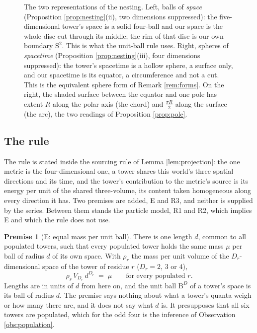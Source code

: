 \documentclass[11pt]{article}
\theoremstyle{definition}
\newtheorem{premise}[theorem]{Premise}
\newcommand{\B}{\mathrm{B}}
\newcommand{\Sph}{\mathrm{S}}
\begin{document}
\begin{figure}[htbp]
\caption{The two representations of the nesting. Left, balls of \emph{space} (Proposition \ref{prop:nesting}(ii), two dimensions suppressed): the five-dimensional tower's space is a solid four-ball and our space is the whole disc cut through its middle; the rim of that disc is our own boundary $\Sph^{2}$. This is what the unit-ball rule uses. Right, spheres of \emph{spacetime} (Proposition \ref{prop:nesting}(iii), four dimensions suppressed): the tower's spacetime is a hollow sphere, a surface only, and our spacetime is its equator, a circumference and not a cut. This is the equivalent sphere form of Remark \ref{rem:forms}. On the right, the shaded surface between the equator and one pole has extent $R$ along the polar axis (the chord) and $\tfrac{\pi R}{2}$ along the surface (the arc), the two readings of Proposition \ref{prop:pole}.}
\label{fig:ballsphere}
\end{figure}

\subsection{The rule}\label{subsec:rule}

The rule is stated inside the sourcing rule of Lemma \ref{lem:projection}: the one metric is the four-dimensional one, a tower shares this world's three spatial directions and its time, and the tower's contribution to the metric's source is its energy per unit of the shared three-volume, its content taken homogeneous along every direction it has. Two premises are added, E and R3, and neither is supplied by the series. Between them stands the particle model, R1 and R2, which implies E and which the rule does not use.

\begin{premise}[E: equal mass per unit ball]\label{prem:E}
There is one length $d$, common to all populated towers, such that every populated tower holds the same mass $\mu$ per ball of radius $d$ of its own space. With $\rho_{r}$ the mass per unit volume of the $D_{r}$-dimensional space of the tower of residue $r$ ($D_{r} = 2$, $3$ or $4$),
\[
\rho_{r}\,V_{D_{r}}\,d^{D_{r}} \;=\; \mu \qquad \text{for every populated } r .
\]
Lengths are in units of $d$ from here on, and the unit ball $\B^{D}$ of a tower's space is its ball of radius $d$. The premise says nothing about what a tower's quanta weigh or how many there are, and it does not say what $d$ is. It presupposes that all six towers are populated, which for the odd four is the inference of Observation \ref{obs:population}.
\end{premise}
\end{document}
